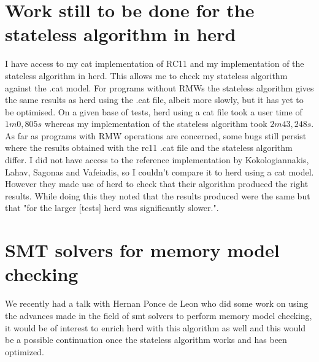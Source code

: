 \documentclass[a4,11pt,dvipsnames]{article}
\begin{document}

\section{Work still to be done for the stateless algorithm in herd}

I have access to my cat implementation of RC11 and my implementation of the stateless algorithm in herd. This allows me to check my stateless algorithm against the .cat model. For programs without RMWs the stateless algorithm gives the same results as herd using the .cat file, albeit more slowly, but it has yet to be optimised. On a given base of tests, herd using a cat file took a user time of $1m0,805s$ whereas my implementation of the stateless algorithm took $2m43,248s$. As far as programs with RMW operations are concerned, some bugs still persist where the results obtained with the rc11 .cat file and the stateless algorithm differ. I did not have access to the reference implementation by Kokologiannakis, Lahav, Sagonas and Vafeiadis, so I couldn't compare it to herd using a cat model. However they made use of herd to check that their algorithm produced the right results. While doing this they noted that the results produced were the same but that "for the larger [tests] herd was significantly slower.".

\section{SMT solvers for memory model checking}

We recently had a talk with Hernan Ponce de Leon who did some work on using the advances made in the field of smt solvers to perform memory model checking, it would be of interest to enrich herd with this algorithm as well and this would be a possible continuation once the stateless algorithm works and has been optimized.
\end{document}
